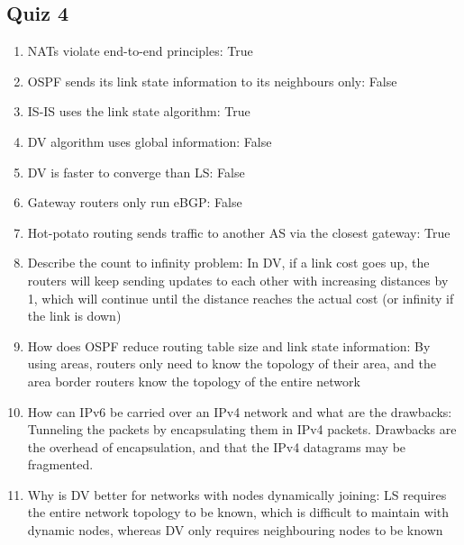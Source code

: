 \subsection{Quiz 4}
\begin{enumerate}
	\itemsep-0.5em
	\item NATs violate end-to-end principles: True
	\item OSPF sends its link state information to its neighbours only: False
	\item IS-IS uses the link state algorithm: True
	\item DV algorithm uses global information: False
	\item DV is faster to converge than LS: False
	\item Gateway routers only run eBGP: False
	\item Hot-potato routing sends traffic to another AS via the closest gateway: True
	\item Describe the count to infinity problem: In DV, if a link cost goes up, the routers will keep sending updates to each other with increasing distances by 1, which will continue until the distance reaches the actual cost (or infinity if the link is down)
	\item How does OSPF reduce routing table size and link state information: By using areas, routers only need to know the topology of their area, and the area border routers know the topology of the entire network
	\item How can IPv6 be carried over an IPv4 network and what are the drawbacks: Tunneling the packets by encapsulating them in IPv4 packets. Drawbacks are the overhead of encapsulation, and that the IPv4 datagrams may be fragmented.
	\item Why is DV better for networks with nodes dynamically joining: LS requires the entire network topology to be known, which is difficult to maintain with dynamic nodes, whereas DV only requires neighbouring nodes to be known
\end{enumerate}

